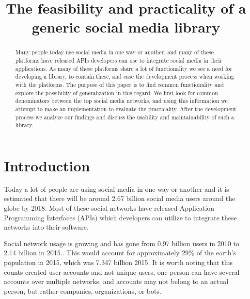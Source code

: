 \documentclass{sigchi-alternate}
\begin{document}

\title{The feasibility and practicality of a generic social media library}

\author{
}

\maketitle

\begin{abstract}
Many people today use social media in one way or another, and many of these platforms have released APIs developers can use to integrate social media
in their applications. As many of these platforms share a lot of functionality we see a need for developing a library, to contain these, and ease the
development process when working with the platforms. The purpose of this paper is to find common functionality and explore the possibility of generalization
in this regard. We first look for common denominators between the top social media networks, and using this information we attempt to make an implementation
to evaluate the practicality. After the development process we analyze our findings and discuss the usability and maintainability of such a library.
\end{abstract}

\section{Introduction}
Today a lot of people are using social media in one way or another and it is estimated that there will be around 2.67 billion social media
users around the globe by 2018\autocite{STATISTA_SN_WORLD_USERS}. Most of these social networks have released Application Programming Interfaces (APIs)
which developers can utilize to integrate these networks into their software.

Social network usage is growing and has gone from 0.97 billion users in 2010 to 2.14 billion in 2015.\autocite{STATISTA_SN_WORLD_USERS}. This would
account for approximately 29\% of the earth's population in 2015, which was 7.347 billion 2015\autocite{WORLD_BANK_POPULATION}. It is worth noting
that this counts created user accounts and not unique users, one person can have several accounts over multiple networks, and accounts may not
belong to an actual person, but rather companies, organizations, or bots.
\end{document}
